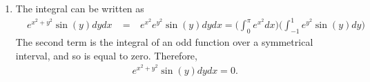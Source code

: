 \documentclass{article}
\begin{document}
\begin{enumerate}
\item %
The integral can be written as
\begin{align*}
  \mathop{\int_0^{\pi} \!\! \int_{-1}^1} e^{x^2 + y^2}\sin(y) dydx 
  &= \mathop{\int_0^{\pi} \!\! \int_{-1}^1} e^{x^2}e^{y^2}\sin(y) dydx  = \Bigg( \int_0^{\pi} e^{x^2} dx \Bigg)\Bigg( \int_{-1}^1 e^{y^2}\sin(y)dy \Bigg)  
\end{align*}
The second term is the integral of an odd function over a symmetrical interval, and so is equal to zero. Therefore,
\begin{align*}
  \mathop{\int_0^{\pi} \!\! \int_{-1}^1} e^{x^2 + y^2}\sin(y) dydx =0.
\end{align*}



\end{enumerate}
\end{document}
